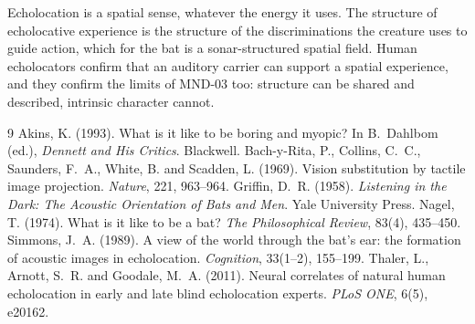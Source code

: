 \documentclass{situationist-preprint}
\begin{document}
Echolocation is a spatial sense, whatever the energy it uses. The structure of echolocative experience is the structure of the discriminations the creature uses to guide action, which for the bat is a sonar-structured spatial field. Human echolocators confirm that an auditory carrier can support a spatial experience, and they confirm the limits of MND-03 too: structure can be shared and described, intrinsic character cannot.

\begin{thebibliography}{9}\small
{} Akins, K. (1993). What is it like to be boring and myopic? In B.~Dahlbom (ed.), \emph{Dennett and His Critics}. Blackwell.
 Bach-y-Rita, P., Collins, C.~C., Saunders, F.~A., White, B. and Scadden, L. (1969). Vision substitution by tactile image projection. \emph{Nature}, 221, 963--964.
 Griffin, D.~R. (1958). \emph{Listening in the Dark: The Acoustic Orientation of Bats and Men}. Yale University Press.
 Nagel, T. (1974). What is it like to be a bat? \emph{The Philosophical Review}, 83(4), 435--450.
 Simmons, J.~A. (1989). A view of the world through the bat's ear: the formation of acoustic images in echolocation. \emph{Cognition}, 33(1--2), 155--199.
 Thaler, L., Arnott, S.~R. and Goodale, M.~A. (2011). Neural correlates of natural human echolocation in early and late blind echolocation experts. \emph{PLoS ONE}, 6(5), e20162.
\end{thebibliography}
\end{document}
